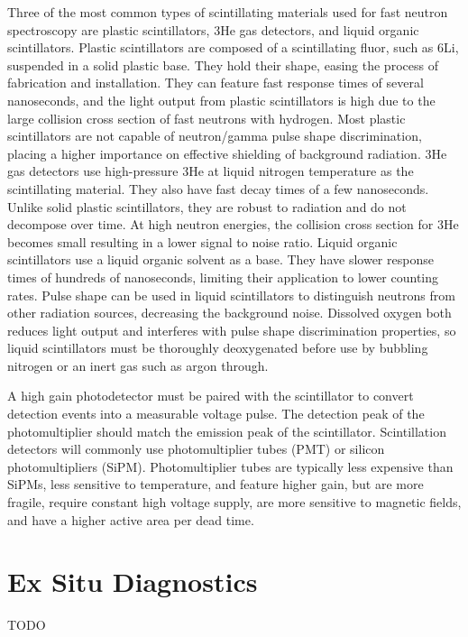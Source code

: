\documentclass{jpp}
\begin{document}
Three of the most common types of scintillating materials used for fast neutron spectroscopy are plastic scintillators, 3He gas detectors, and liquid organic scintillators. Plastic scintillators are composed of a scintillating fluor, such as 6Li, suspended in a solid plastic base. They hold their shape, easing the process of fabrication and installation. They can feature fast response times of several nanoseconds, and the light output from plastic scintillators is high due to the large collision cross section of fast neutrons with hydrogen. Most plastic scintillators are not capable of neutron/gamma pulse shape discrimination, placing a higher importance on effective shielding of background radiation. 3He gas detectors use high-pressure 3He at liquid nitrogen temperature as the scintillating material. They also have fast decay times of a few nanoseconds. Unlike solid plastic scintillators, they are robust to radiation and do not decompose over time. At high neutron energies, the collision cross section for 3He becomes small resulting in a lower signal to noise ratio. Liquid organic scintillators use a liquid organic solvent as a base. They have slower response times of hundreds of nanoseconds, limiting their application to lower counting rates. Pulse shape can be used in liquid scintillators to distinguish neutrons from other radiation sources, decreasing the background noise. Dissolved oxygen both reduces light output and interferes with pulse shape discrimination properties, so liquid scintillators must be thoroughly deoxygenated before use by bubbling nitrogen or an inert gas such as argon through.

A high gain photodetector must be paired with the scintillator to convert detection events into a measurable voltage pulse. The detection peak of the photomultiplier should match the emission peak of the scintillator. Scintillation detectors will commonly use photomultiplier tubes (PMT) or silicon photomultipliers (SiPM). Photomultiplier tubes are typically less expensive than SiPMs, less sensitive to temperature, and feature higher gain, but are more fragile, require constant high voltage supply, are more sensitive to magnetic fields, and have a higher active area per dead time.

\section{Ex Situ Diagnostics}

{\Large TODO \par}
\end{document}
